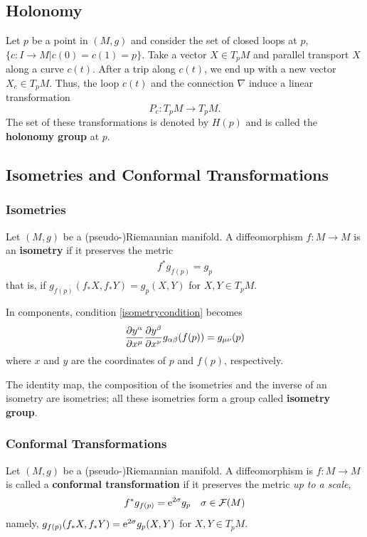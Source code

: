 \documentclass[10pt]{article}
\begin{document}
\subsection{Holonomy}
\begin{definition}
    Let $p$ be a point in $(M,g)$ and consider the set of closed loops at $p$, $\{c:I\to M| c(0)=c(1)=p\}$.
    Take a vector $X\in T_p M$ and parallel transport $X$ along a curve $c(t)$.
    After a trip along $c(t)$, we end up with a new vector $X_c\in T_p M$.
    Thus, the loop $c(t)$ and the connection $\nabla$ induce a linear transformation
    \begin{equation}
        P_c:T_p M\to T_p M.
    \end{equation}
    The set of these transformations is denoted by $H(p)$ and is called the \textbf{holonomy group} at $p$.
\end{definition}
\subsection{Isometries and Conformal Transformations}
\subsubsection{Isometries}
\begin{definition}[Isometry]
    Let $(M,g)$ be a (pseudo-)Riemannian manifold.
    A diffeomorphism $f:M\to M$ is an \textbf{isometry} if it preserves the metric
    \begin{align}
        f^*g_{f(p)}=g_p\label{isometrycondition}
    \end{align}
    that is, if $g_{f(p)}(f_*X,f_*Y)=g_p(X,Y)$ for $X,Y\in T_p M$.
\end{definition}

In components, condition \eqref{isometrycondition} becomes
\begin{align}
    \pdv{y^\alpha}{x^\mu}\pdv{y^\beta}{x^\nu}g_{\alpha\beta}(f(p))=g_{\mu\nu}(p)\label{isometrycomponent}
\end{align}
where $x$ and $y$ are the coordinates of $p$ and $f(p)$, respectively.

The identity map, the composition of the isometries and the inverse of an isometry are isometries;
all these isometries form a group called \textbf{isometry group}.

\subsubsection{Conformal Transformations}
\begin{definition}
    Let $(M,g)$ be a (pseudo-)Riemannian manifold.
    A diffeomorphism is $f:M\to M$ is called a \textbf{conformal transformation} if it preserves the metric \textit{up to a scale},
    \begin{align}
        f^*g_{f(p)}=\mathrm{e}^{2\sigma}g_p\quad\sigma\in\mathcal{F}(M)
    \end{align}
    namely, $g_{f(p)}(f_*X,f_*Y)=\mathrm{e}^{2\sigma}g_p(X,Y)$ for $X,Y\in T_pM$.
\end{definition}
\end{document}
